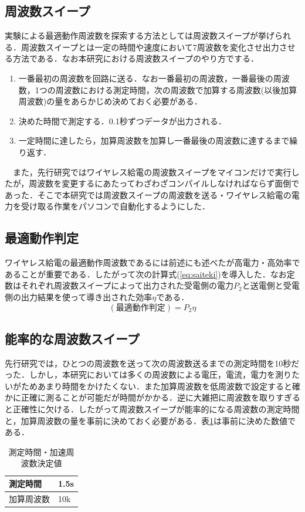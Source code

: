 \documentclass[10pt,a4paper,twocolumn]{jarticle}
\begin{document}
\subsection{周波数スイープ}
実験による最適動作周波数を探索する方法としては周波数スイープが挙げられる．周波数スイープとは一定の時間や速度において7周波数を変化させ出力させる方法である．なお本研究における周波数スイープのやり方でする．
\begin{enumerate}
	\item  一番最初の周波数を回路に送る．なお一番最初の周波数，一番最後の周波数，1つの周波数における測定時間，次の周波数で加算する周波数(以後加算周波数)の量をあらかじめ決めておく必要がある．
	\item 決めた時間で測定する．0.1秒ずつデータが出力される．
	\item 一定時間に達したら，加算周波数を加算し一番最後の周波数に達するまで繰り返す．
\end{enumerate}
　また，先行研究ではワイヤレス給電の周波数スイープをマイコンだけで実行したが，周波数を変更するにあたってわざわざコンパイルしなければならず面倒であった．そこで本研究では周波数スイープの周波数を送る・ワイヤレス給電の電力を受け取る作業をパソコンで自動化するようにした．
\subsection{最適動作判定}
ワイヤレス給電の最適動作周波数であるには前述にも述べたが高電力・高効率であることが重要である．したがって次の計算式(\ref{eq:saiteki})を導入した．なお定数はそれぞれ周波数スイープによって出力された受電側の電力$P_2$と送電側と受電側の出力結果を使って導き出された$効率\eta$である．
\begin{equation}
(最適動作判定)=P_2\eta
\label{eq:saiteki}
\end{equation}
\subsection{能率的な周波数スイープ}
先行研究では，ひとつの周波数を送って次の周波数送るまでの測定時間を10秒だった．しかし，本研究においては多くの周波数による電圧，電流，電力を測りたいがためあまり時間をかけたくない．また加算周波数を低周波数で設定すると確かに正確に測ることが可能だが時間がかかる．逆に大雑把に周波数を取りすぎると正確性に欠ける．したがって周波数スイープが能率的になる周波数の測定時間と，加算周波数の量を事前に決めておく必要がある．表\ref{tab:nouritu}は事前に決めた数値である．
\begin{table}[h]
	\centering

	\caption{測定時間・加速周波数決定値}
	\begin{tabular}{|l|l|}
		\hline
		測定時間  & 1.5s \\ \hline
		加算周波数 & 10k  \\ \hline
	\end{tabular}
\label{tab:nouritu}
\end{table}
\end{document}
